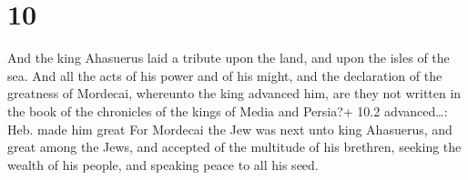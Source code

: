 \hypertarget{section-9}{%
\section{10}\label{section-9}}

 And the king Ahasuerus laid a tribute upon the land, and
upon the isles of the sea.  And all the acts of his power
and of his might, and the declaration of the greatness of Mordecai,
whereunto the king advanced him, are they not written in the book of the
chronicles of the kings of Media and Persia?+ 10.2 advanced\ldots: Heb.
made him great  For Mordecai the Jew was next unto king
Ahasuerus, and great among the Jews, and accepted of the multitude of
his brethren, seeking the wealth of his people, and speaking peace to
all his seed.
